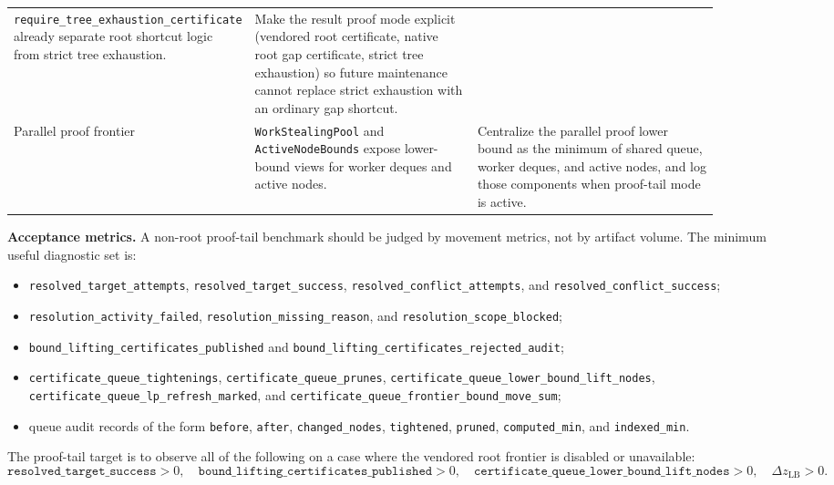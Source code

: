\begin{longtable}{@{}L{0.18\linewidth}L{0.34\linewidth}L{0.38\linewidth}@{}}
\texttt{require\_tree\_exhaustion\_certificate} already separate root shortcut
logic from strict tree exhaustion. & Make the result proof mode explicit
(vendored root certificate, native root gap certificate, strict tree
exhaustion) so future maintenance cannot replace strict exhaustion with an
ordinary gap shortcut. \\
Parallel proof frontier & \texttt{WorkStealingPool} and \texttt{ActiveNodeBounds}
expose lower-bound views for worker deques and active nodes. & Centralize the
parallel proof lower bound as the minimum of shared queue, worker deques, and
active nodes, and log those components when proof-tail mode is active. \\
\bottomrule
\end{longtable}

\textbf{Acceptance metrics.}  A non-root proof-tail benchmark should be judged
by movement metrics, not by artifact volume.  The minimum useful diagnostic set
is:
\begin{itemize}
  \item \texttt{resolved\_target\_attempts}, \texttt{resolved\_target\_success},
    \texttt{resolved\_conflict\_attempts}, and
    \texttt{resolved\_conflict\_success};
  \item \texttt{resolution\_activity\_failed},
    \texttt{resolution\_missing\_reason}, and
    \texttt{resolution\_scope\_blocked};
  \item \texttt{bound\_lifting\_certificates\_published} and
    \texttt{bound\_lifting\_certificates\_rejected\_audit};
  \item \texttt{certificate\_queue\_tightenings},
    \texttt{certificate\_queue\_prunes},
    \texttt{certificate\_queue\_lower\_bound\_lift\_nodes},
    \texttt{certificate\_queue\_lp\_refresh\_marked}, and
    \texttt{certificate\_queue\_frontier\_bound\_move\_sum};
  \item queue audit records of the form
    \texttt{before}, \texttt{after}, \texttt{changed\_nodes},
    \texttt{tightened}, \texttt{pruned}, \texttt{computed\_min}, and
    \texttt{indexed\_min}.
\end{itemize}

The proof-tail target is to observe all of the following on a case where the
vendored root frontier is disabled or unavailable:
\[
  \texttt{resolved\_target\_success} > 0,
  \quad
  \texttt{bound\_lifting\_certificates\_published} > 0,
  \quad
  \texttt{certificate\_queue\_lower\_bound\_lift\_nodes} > 0,
  \quad
  \Delta z_{\mathrm{LB}} > 0.
\]

